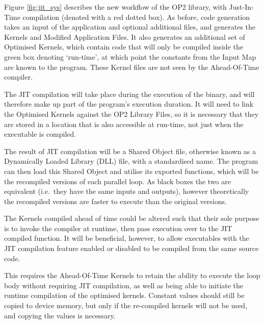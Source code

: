 \noindent Figure \ref{fig:jit_sys} describes the new workflow of the OP2 library, with Just-In-Time compilation (denoted with a red dotted box). As before, code generation takes an input of the application and optional additional files, and generates the Kernels and Modified Application Files. It also generates an additional set of Optimised Kernels, which contain code that will only be compiled inside the green box denoting `run-time', at which point the constants from the Input Map are known to the program. These Kernel files are not seen by the Ahead-Of-Time compiler.
\par
The JIT compilation will take place during the execution of the binary, and will therefore make up part of the program's execution duration. It will need to link the Optimised Kernels against the OP2 Library Files, so it is necessary that they are stored in a location that is also accessible at run-time, not just when the executable is compiled.
\par
The result of JIT compilation will be a Shared Object file, otherwise known as a Dynamically Loaded Library (DLL) file, with a standardised name. The program can then load this Shared Object and utilise its exported functions, which will be the recompiled versions of each parallel loop. As black boxes the two are equivalent (i.e.\ they have the same inputs and outputs), however theoretically the recompiled versions are faster to execute than the original versions.


\noindent The Kernels compiled ahead of time could be altered such that their sole purpose is to invoke the compiler at runtime, then pass execution over to the JIT compiled function. It will be beneficial, however, to allow executables with the JIT compilation feature enabled or disabled to be compiled from the same source code.
\par
This requires the Ahead-Of-Time Kernels to retain the ability to execute the loop body without requiring JIT compilation, as well as being able to initiate the runtime compilation of the optimised kernels. Constant values should still be copied to device memory, but only if the re-compiled kernels will not be used, and copying the values is necessary.
\clearpage
